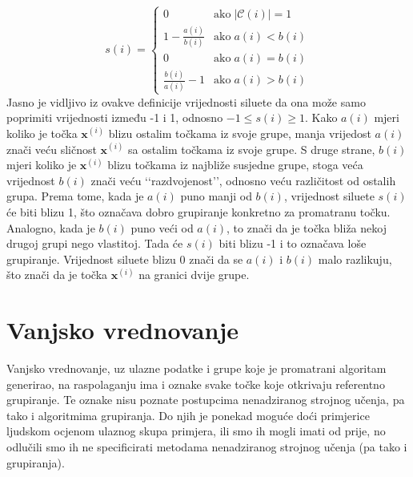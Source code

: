\documentclass[times, utf8, zavrsni]{fer}
\begin{document}
\[
s (i) = \begin{cases}
 0 & \text{ako} \; \left\vert \mathcal{C} \left(i\right) \right\vert = 1 \\
 1 - \frac{a (i)}{b (i)} & \text{ako} \; a (i) < b (i) \\  
 0 & \text{ako} \; a (i) = b (i) \\  
 \frac{b (i)}{a (i)} - 1 & \text{ako} \; a (i) > b(i)  
 \end{cases}
\]
Jasno je vidljivo iz ovakve definicije vrijednosti siluete da ona može samo poprimiti vrijednosti između -1 i 1, odnosno $-1 \leq s (i) \geq 1$. Kako $a (i)$ mjeri koliko je točka $\mathbf{x}^{(i)}$ blizu ostalim točkama iz svoje grupe, manja vrijedost $a(i)$ znači veću sličnost $\mathbf{x}^{(i)}$ sa ostalim točkama iz svoje grupe. S druge strane, $b(i)$ mjeri koliko je $\mathbf{x}^{(i)}$ blizu točkama iz najbliže susjedne grupe, stoga veća vrijednost $b (i)$ znači veću ‘‘razdvojenost’’, odnosno veću različitost od ostalih grupa. Prema tome, kada je $a(i)$ puno manji od $b(i)$, vrijednost siluete $s (i)$ će biti blizu 1, što označava dobro grupiranje konkretno za promatranu točku. Analogno, kada je $b (i)$ puno veći od $a (i)$, to znači da je točka bliža nekoj drugoj grupi nego vlastitoj. Tada će $s(i)$ biti blizu -1 i to označava loše grupiranje. Vrijednost siluete blizu 0 znači da se $a(i)$ i $b(i)$ malo razlikuju, što znači da je točka $\mathbf{x}^{(i)}$ na granici dvije grupe.

\section{Vanjsko vrednovanje}
Vanjsko vrednovanje, uz ulazne podatke i grupe koje je promatrani algoritam generirao, na raspolaganju ima i oznake svake točke koje otkrivaju referentno grupiranje. Te oznake nisu poznate postupcima nenadziranog strojnog učenja, pa tako i algoritmima grupiranja. Do njih je ponekad moguće doći primjerice ljudskom ocjenom ulaznog skupa primjera, ili smo ih mogli imati od prije, no odlučili smo ih ne specificirati metodama nenadziranog strojnog učenja (pa tako i grupiranja).
\end{document}
